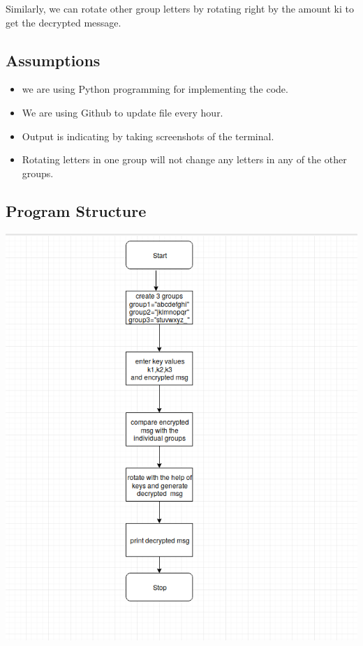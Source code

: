 \documentclass[a4paper,12pt]{article}
\begin{document}
\begin{flushleft}
\begin{flushleft}
Similarly, we can rotate other group letters by rotating right by the amount ki to get the decrypted message.\\



\end{flushleft} 
\subsection{Assumptions}
\begin{itemize}
\item we are using Python programming for implementing the code.
\item We are using Github to update file every hour.
\item Output is indicating by taking screenshots of the terminal.
\item Rotating letters in one group will not change any letters in any of the other groups.
\end{itemize}
\subsection{Program Structure}
\includegraphics[scale=0.6]{flow2.png}

\end{flushleft}
\end{document}
